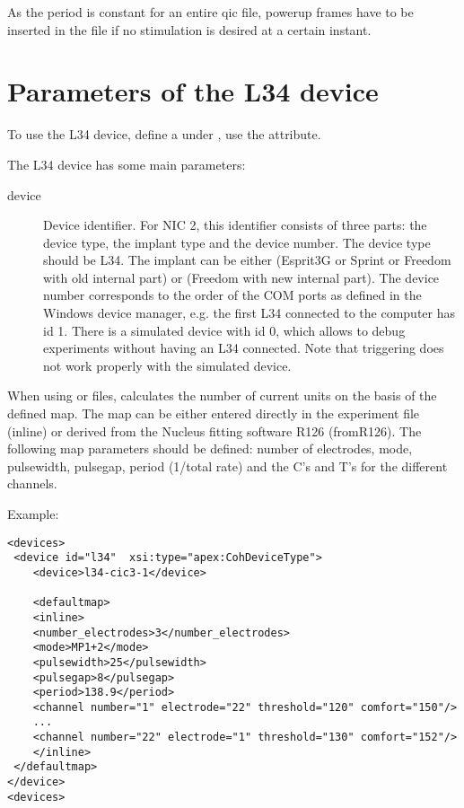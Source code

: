 As the period is constant for an entire qic file, powerup frames have to be inserted in the file if no stimulation is desired at a certain instant.



\section{Parameters of the L34 device}

To use the L34 device, define a  under , use the  attribute.

The L34 device has some main parameters:
\begin{description}
\item[device] Device identifier. For NIC 2, this identifier consists of three parts: the device type, the implant type and the device number. The device type should be L34. The implant can be either  (Esprit3G or Sprint or Freedom with old internal part) or  (Freedom with new internal part).
    The device number corresponds to the order of the COM ports as defined in the Windows device manager, e.g. the first L34 connected to the computer has id 1. There is a simulated device with id 0, which allows to debug experiments without having an L34 connected. Note that triggering does not work properly with the simulated device.
\end{description}

When using  or  files, \apex calculates the number of current units on the basis of the
defined map. The map can be either entered directly in the experiment file (inline) or
derived from the Nucleus fitting software R126 (fromR126).
The following map parameters should be defined: number of electrodes,
mode, pulsewidth, pulsegap, period (1/total rate) and the C's and
T's for the different channels.

Example:
\begin{lstlisting}
<devices>
 <device id="l34"  xsi:type="apex:CohDeviceType">
    <device>l34-cic3-1</device>

    <defaultmap>
    <inline>
    <number_electrodes>3</number_electrodes>
    <mode>MP1+2</mode>
    <pulsewidth>25</pulsewidth>
    <pulsegap>8</pulsegap>
    <period>138.9</period>
    <channel number="1" electrode="22" threshold="120" comfort="150"/>
    ...
    <channel number="22" electrode="1" threshold="130" comfort="152"/>
    </inline>
 </defaultmap>
</device>
<devices>
\end{lstlisting}


